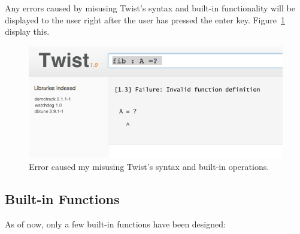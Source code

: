 Any errors caused by misusing Twist's syntax and built-in functionality will be displayed to the user right after the user has pressed the enter key. Figure~\ref{fig:error} display this.

\begin{figure}[!ht]
    \centering
    \includegraphics[width=\textwidth]{images/error}
    \caption{Error caused my misusing Twist's syntax and built-in operations.}
    \label{fig:error}
\end{figure}

\subsection{Built-in Functions}
\label{sec:functions}
 
As of now, only a few built-in functions have been designed:

